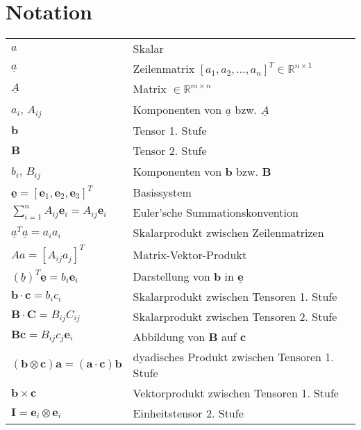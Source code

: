 \chapter*{Notation}
\hspace*{-3mm}
\begin{tabular}{l l}
$a$ & Skalar\\
$\underline a$ & Zeilenmatrix $ [a_1,a_2,...,a_n]^T \in \mathbb R^{n\times 1}$ \\[1mm]
$\underline A$ & Matrix $\in \mathbb R^{m\times n}$\\[1mm]
$a_i$, $A_{ij}$& Komponenten von $\underline a$ bzw. $\underline A$\\[3mm]
$\boldsymbol b$ & Tensor 1. Stufe \\[1mm]
$\boldsymbol B$ & Tensor 2. Stufe \\[1mm]
$b_{i}$, $B_{ij}$& Komponenten von $\boldsymbol b$ bzw. $\boldsymbol B$\\[5mm]
$\underline{\boldsymbol e} = [\boldsymbol e_1,\boldsymbol e_2,\boldsymbol e_3]^T$ & Basissystem \\[5mm]
$\sum_{i=1}^{n} A_{ij}\boldsymbol e_i = A_{ij}\boldsymbol e_i$& Euler'sche Summationskonvention\\[5mm]
$\underline a^T \underline a = a_i a_i$& Skalarprodukt zwischen Zeilenmatrizen\\[1mm]
$A a = \left[A_{ij}a_j\right]^T$& Matrix-Vektor-Produkt\\[5mm]
$(\underline b)^T\underline{\boldsymbol e } = b_i\boldsymbol e_i$ & Darstellung von $\boldsymbol b$ in $\underline{\boldsymbol e}$ \\[5mm]
$\boldsymbol b \cdot \boldsymbol c = b_i c_i$ & Skalarprodukt zwischen Tensoren 1. Stufe\\[1mm]
$\boldsymbol B \cdot \boldsymbol C = B_{ij} C_{ij}$ & Skalarprodukt zwischen Tensoren 2. Stufe\\[1mm]
$\boldsymbol B \boldsymbol c = B_{ij} c_{j}\boldsymbol e_i$ & Abbildung von $\boldsymbol B$ auf $\boldsymbol c$\\[1mm]
$(\boldsymbol b \otimes \boldsymbol c)\boldsymbol a = (\boldsymbol a\cdot \boldsymbol c)\boldsymbol b$ & dyadisches Produkt zwischen Tensoren 1. Stufe\\[1mm]
$\boldsymbol b \times \boldsymbol c $ & Vektorprodukt zwischen Tensoren 1. Stufe\\[5mm]
$\boldsymbol I=\boldsymbol e_i\otimes\boldsymbol e_i $ & Einheitstensor 2. Stufe\\[1mm]

\end{tabular}
